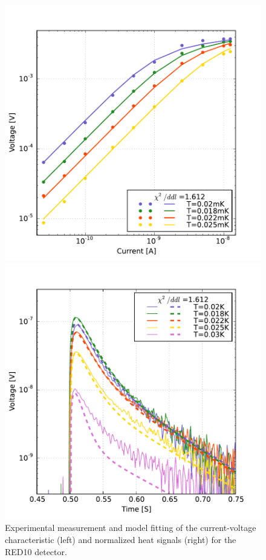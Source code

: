 \begin{figure}
\begin{minipage}{0.49\textwidth}
\includegraphics[width=\textwidth]{Figures/Ethem/v2i_red10.pdf}
\end{minipage}
\hfill
\begin{minipage}{0.49\textwidth}
\includegraphics[width=\textwidth]{Figures/Ethem/pulse_red10.pdf}
\end{minipage}
\caption{Experimental measurement and model fitting of the current-voltage characteristic (left) and normalized heat signals (right) for the RED10 detector.}
\label{fig:v2i-red10}
\end{figure}

